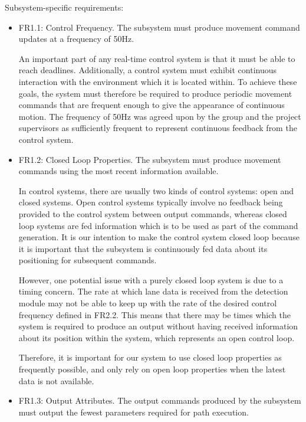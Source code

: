\documentclass[titlepage,draft]{article}
\begin{document}
{\begin{itemize}
\end{itemize}
Subsystem-specific requirements:
\begin{itemize}

	\item FR1.1: Control Frequency.
	      The subsystem must produce movement command updates at a frequency of 50Hz.

	      An important part of any real-time control system is that it must be able to reach deadlines. Additionally, a control system must exhibit continuous interaction with the environment which it is located within. To achieve these goals, the system must therefore be required to produce periodic movement commands that are frequent enough to give the appearance of continuous motion. The frequency of 50Hz was agreed upon by the group and the project supervisors as sufficiently frequent to represent continuous feedback from the control system.

	\item FR1.2: Closed Loop Properties.
	      The subsystem must produce movement commands using the most recent information available.

	      In control systems, there are usually two kinds of control systems: open and closed systems. Open control systems typically involve no feedback being provided to the control system between output commands, whereas closed loop systems are fed information which is to be used as part of the command generation. It is our intention to make the control system closed loop because it is important that the subsystem is continuously fed data about its positioning for subsequent commands.

	      However, one potential issue with a purely closed loop system is due to a timing concern. The rate at which lane data is received from the detection module may not be able to keep up with the rate of the desired control frequency defined in FR2.2. This means that there may be times which the system is required to produce an output without having received information about its position within the system, which represents an open control loop.

	      Therefore, it is important for our system to use closed loop properties as frequently possible, and only rely on open loop properties when the latest data is not available.

	\item FR1.3: Output Attributes. The output commands produced by the subsystem must output the fewest parameters required for path execution.


\end{itemize}}
\end{document}
